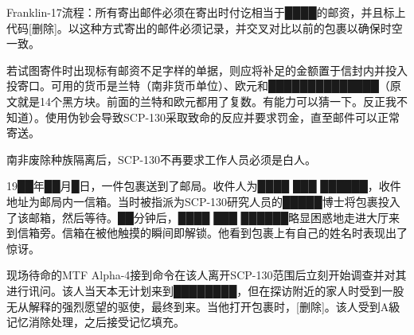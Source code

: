 Franklin-17流程：所有寄出邮件必须在寄出时付讫相当于████的邮资，并且标上代码{[}删除]。以这种方式寄出的邮件必须记录，并交叉对比以前的包裹以确保时空一致。

若试图寄件时出现标有邮资不足字样的单据，则应将补足的金额置于信封内并投入投寄口。可用的货币是兰特（南非货币单位）、欧元和██████████████（原文就是14个黑方块。前面的兰特和欧元都用了复数。有能力可以猜一下。反正我不知道）。使用伪钞会导致SCP-130采取致命的反应并要求罚金，直至邮件可以正常寄送。

南非废除种族隔离后，SCP-130不再要求工作人员必须是白人。

19██年██月█日，一件包裹送到了邮局。收件人为████ ███ ██████，收件地址为邮局内一信箱。当时被指派为SCP-130研究人员的█████博士将包裹投入了该邮箱，然后等待。██分钟后，████ ███ ██████略显困惑地走进大厅来到信箱旁。信箱在被他触摸的瞬间即解锁。他看到包裹上有自己的姓名时表现出了惊讶。

现场待命的MTF Alpha-4接到命令在该人离开SCP-130范围后立刻开始调查并对其进行讯问。该人当天本无计划来到████████，但在探访附近的家人时受到一股无从解释的强烈愿望的驱使，最终到来。当他打开包裹时，{[}删除]。该人受到A級记忆消除处理，之后接受记忆填充。

\newpage

